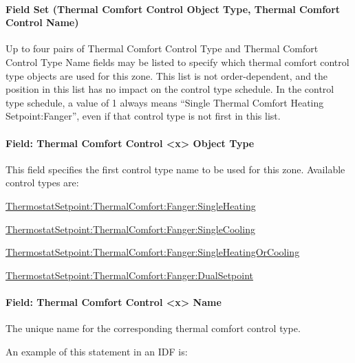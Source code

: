 \paragraph{Field Set (Thermal Comfort Control Object Type, Thermal Comfort Control Name)}\label{field-set-thermal-comfort-control-object-type-thermal-comfort-control-name}

Up to four pairs of Thermal Comfort Control Type and Thermal Comfort Control Type Name fields may be listed to specify which thermal comfort control type objects are used for this zone. This list is not order-dependent, and the position in this list has no impact on the control type schedule. In the control type schedule, a value of 1 always means ``Single Thermal Comfort Heating Setpoint:Fanger'', even if that control type is not first in this list.

\paragraph{Field: Thermal Comfort Control \textless{}x\textgreater{} Object Type}\label{field-thermal-comfort-control-x-object-type}

This field specifies the first control type name to be used for this zone. Available control types are:

\hyperref[thermostatsetpointthermalcomfortfangersingleheating]{ThermostatSetpoint:ThermalComfort:Fanger:SingleHeating}

\hyperref[thermostatsetpointthermalcomfortfangersinglecooling]{ThermostatSetpoint:ThermalComfort:Fanger:SingleCooling}

\hyperref[thermostatsetpointthermalcomfortfangersingleheatingorcooling]{ThermostatSetpoint:ThermalComfort:Fanger:SingleHeatingOrCooling}

\hyperref[thermostatsetpointthermalcomfortfangerdualsetpoint]{ThermostatSetpoint:ThermalComfort:Fanger:DualSetpoint}

\paragraph{Field: Thermal Comfort Control \textless{}x\textgreater{} Name}\label{field-thermal-comfort-control-x-name}

The unique name for the corresponding thermal comfort control type.

An example of this statement in an IDF is:

